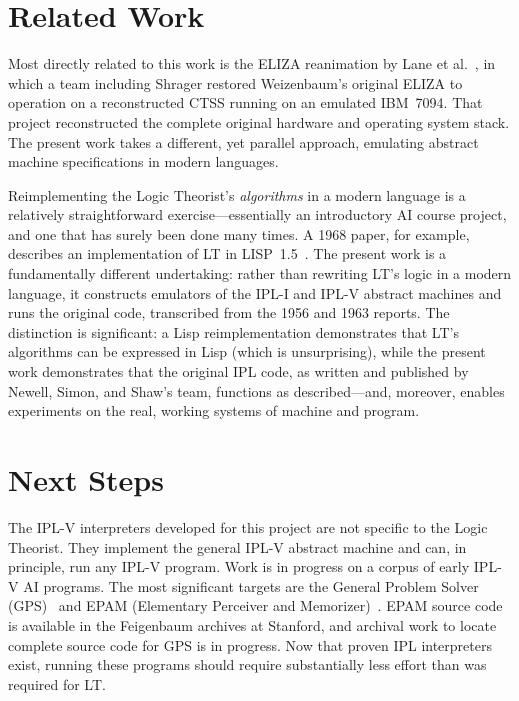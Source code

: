 \documentclass[journal]{IEEEtran}
\begin{document}
\section{Related Work}
\label{sec:related}

Most directly related to this work
is the ELIZA reanimation by Lane
et al.~\cite{lane2025eliza}, in which a team including Shrager
restored Weizenbaum's original ELIZA to operation on a
reconstructed CTSS running on an emulated IBM~7094. That project
reconstructed the complete original hardware and operating system
stack. The present work takes a different, yet parallel approach, emulating 
abstract machine specifications in modern languages.

Reimplementing the Logic Theorist's \textit{algorithms} in a modern
language is a relatively straightforward exercise---essentially an
introductory AI course project, and one that has surely been done many
times. A 1968 paper, for example, describes an implementation of LT in
LISP~1.5~\cite{millstein1968logic}. The present work is a
fundamentally different undertaking: rather than rewriting LT's logic
in a modern language, it constructs emulators of the IPL-I
and IPL-V abstract machines and runs the original code, transcribed
from the 1956 and 1963 reports. The distinction is
significant: a Lisp reimplementation demonstrates that LT's algorithms
can be expressed in Lisp (which is unsurprising), while the present
work demonstrates that the original IPL code, as written and published
by Newell, Simon, and Shaw's team, functions as described---and,
moreover, enables experiments on the real, working systems of machine
and program.

\section{Next Steps}
\label{sec:next}

The IPL-V interpreters developed for this project are not specific to
the Logic Theorist. They implement the general IPL-V abstract machine
and can, in principle, run any IPL-V program. Work is in progress on
a corpus of early IPL-V AI programs. The most significant targets are
the General Problem Solver (GPS)~\cite{newell1959gps} and EPAM
(Elementary Perceiver and Memorizer)~\cite{feigenbaum1961epam}. 
EPAM source code is available in the Feigenbaum archives at Stanford, and
archival work to locate complete source code for GPS is in progress.
Now that proven IPL interpreters exist, running these programs should
require substantially less effort than was required for LT.
\end{document}
